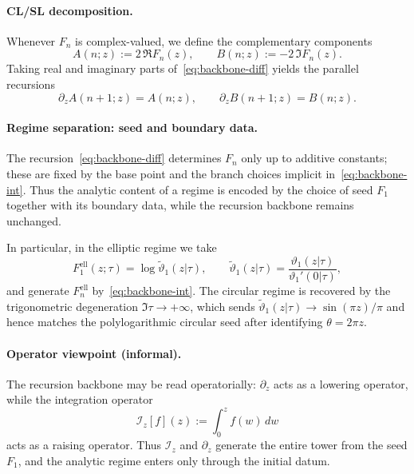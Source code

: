 \documentclass[11pt]{article}
\begin{document}
\paragraph{CL/SL decomposition.}
Whenever $F_n$ is complex-valued, we define the complementary components
\begin{equation}\label{eq:backbone-CLSL}
A(n;z):=2\,\Re F_n(z),
\qquad
B(n;z):=-2\,\Im F_n(z).
\end{equation}
Taking real and imaginary parts of~\eqref{eq:backbone-diff} yields the parallel recursions
\begin{equation}\label{eq:backbone-CLSL-rec}
\partial_z A(n+1;z)=A(n;z),
\qquad
\partial_z B(n+1;z)=B(n;z).
\end{equation}

\paragraph{Regime separation: seed and boundary data.}
The recursion~\eqref{eq:backbone-diff} determines $F_n$ only up to additive constants;
these are fixed by the base point and the branch choices implicit in~\eqref{eq:backbone-int}.
Thus the analytic content of a regime is encoded by the choice of seed $F_1$
together with its boundary data, while the recursion backbone remains unchanged.

In particular, in the elliptic regime we take
\[
F^{\mathrm{ell}}_1(z;\tau)=\log\widetilde{\vartheta}_1(z|\tau),
\qquad
\widetilde{\vartheta}_1(z|\tau)=\frac{\vartheta_1(z|\tau)}{\vartheta_1'(0|\tau)},
\]
and generate $F^{\mathrm{ell}}_{n}$ by~\eqref{eq:backbone-int}.
The circular regime is recovered by the trigonometric degeneration $\Im\tau\to+\infty$,
which sends $\widetilde{\vartheta}_1(z|\tau)\to \sin(\pi z)/\pi$ and hence matches the
polylogarithmic circular seed after identifying $\theta=2\pi z$.

\paragraph{Operator viewpoint (informal).}
The recursion backbone may be read operatorially:
$\partial_z$ acts as a lowering operator,
while the integration operator
\[
\mathcal{I}_z[f](z):=\int_{0}^{z} f(w)\,dw
\]
acts as a raising operator.
Thus $\mathcal{I}_z$ and $\partial_z$ generate the entire tower from the seed $F_1$,
and the analytic regime enters only through the initial datum.
\end{document}

